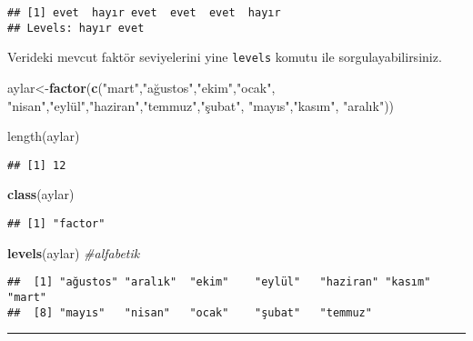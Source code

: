 \documentclass[
]{book}
\newenvironment{Shaded}{\begin{snugshade}}{\end{snugshade}}
\newcommand{\CommentTok}[1]{\textcolor[rgb]{0.56,0.35,0.01}{\textit{#1}}}
\newcommand{\KeywordTok}[1]{\textcolor[rgb]{0.13,0.29,0.53}{\textbf{#1}}}
\newcommand{\NormalTok}[1]{#1}
\newcommand{\StringTok}[1]{\textcolor[rgb]{0.31,0.60,0.02}{#1}}
\begin{document}
\begin{verbatim}
## [1] evet  hayır evet  evet  evet  hayır
## Levels: hayır evet
\end{verbatim}

Verideki mevcut faktör seviyelerini yine \texttt{levels} komutu ile sorgulayabilirsiniz.

\begin{Shaded}
\begin{Highlighting}[]
\NormalTok{aylar<-}\KeywordTok{factor}\NormalTok{(}\KeywordTok{c}\NormalTok{(}\StringTok{"mart"}\NormalTok{,}\StringTok{"ağustos"}\NormalTok{,}\StringTok{"ekim"}\NormalTok{,}\StringTok{"ocak"}\NormalTok{, }\StringTok{"nisan"}\NormalTok{,}\StringTok{"eylül","}\NormalTok{haziran}\StringTok{","}\NormalTok{temmuz}\StringTok{","}\NormalTok{şubat}\StringTok{",}
\StringTok{                "}\NormalTok{mayıs}\StringTok{","}\NormalTok{kasım}\StringTok{", "}\NormalTok{aralık}\StringTok{"))}

\StringTok{length(aylar)}
\end{Highlighting}
\end{Shaded}

\begin{verbatim}
## [1] 12
\end{verbatim}

\begin{Shaded}
\begin{Highlighting}[]
\KeywordTok{class}\NormalTok{(aylar)}
\end{Highlighting}
\end{Shaded}

\begin{verbatim}
## [1] "factor"
\end{verbatim}

\begin{Shaded}
\begin{Highlighting}[]
\KeywordTok{levels}\NormalTok{(aylar) }\CommentTok{#alfabetik}
\end{Highlighting}
\end{Shaded}

\begin{verbatim}
##  [1] "ağustos" "aralık"  "ekim"    "eylül"   "haziran" "kasım"   "mart"   
##  [8] "mayıs"   "nisan"   "ocak"    "şubat"   "temmuz"
\end{verbatim}

\begin{center}\rule{0.5\linewidth}{0.5pt}\end{center}
\end{document}
